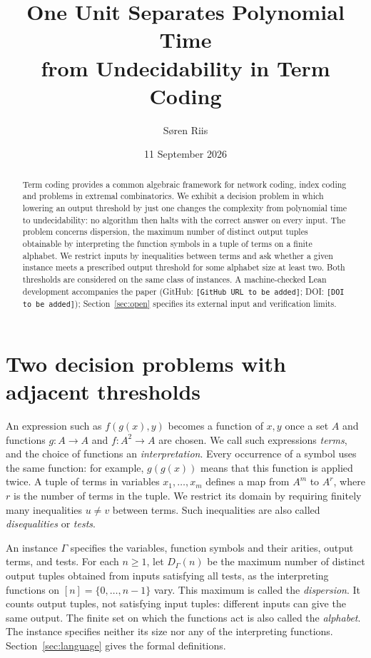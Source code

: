 \documentclass[12pt]{article}
\title{One Unit Separates Polynomial Time\\from Undecidability in Term Coding}
\author{S\o ren Riis}
\date{11 September 2026}
\theoremstyle{definition}
\newcommand{\PaperThreeLeanGitHub}{\texttt{[GitHub URL to be added]}}
\newcommand{\PaperThreeLeanDOI}{\texttt{[DOI to be added]}}
\begin{document}
\maketitle
\begin{abstract}
Term coding provides a common algebraic framework for network coding,
index coding and problems in extremal combinatorics. We exhibit a
decision problem in which lowering an output threshold by just one
changes the complexity from polynomial time to undecidability: no
algorithm then halts with the correct answer on every input.
The problem concerns dispersion, the maximum number of distinct output
tuples obtainable by interpreting the function symbols in a tuple of
terms on a finite alphabet. We restrict inputs by inequalities between
terms and ask whether a given instance meets a prescribed output
threshold for some alphabet size at least two. Both thresholds are
considered on the same class of instances.
A machine-checked Lean development accompanies the paper
(GitHub: \PaperThreeLeanGitHub; DOI: \PaperThreeLeanDOI);
Section~\ref{sec:open} specifies its external input and verification limits.
\end{abstract}

\section{Two decision problems with adjacent thresholds}
An expression such as $f(g(x),y)$ becomes a function of $x,y$ once a set
$A$ and functions $g:A\to A$ and $f:A^2\to A$ are chosen. We call such
expressions \emph{terms}, and the choice of functions an
\emph{interpretation}. Every occurrence of a symbol uses the same
function: for example, $g(g(x))$ means that this function is applied
twice. A tuple of terms in variables $x_1,\ldots,x_m$ defines a map
from $A^m$ to $A^r$, where $r$ is the number of terms in the tuple.
We restrict its domain by requiring finitely many inequalities
$u\ne v$ between terms. Such inequalities are also called
\emph{disequalities} or \emph{tests}.

An instance $\Gamma$ specifies the variables, function symbols and their
arities, output terms, and tests. For each $n\ge1$, let $D_\Gamma(n)$
be the maximum number of distinct output tuples obtained from inputs
satisfying all tests, as the interpreting functions on
$[n]=\{0,\ldots,n-1\}$ vary. This maximum is called the
\emph{dispersion}. It counts output tuples, not satisfying input tuples:
different inputs can give the same output. The finite set on which the
functions act is also called the \emph{alphabet}. The instance specifies
neither its size nor any of the interpreting functions.
Section~\ref{sec:language} gives the formal definitions.
\end{document}
